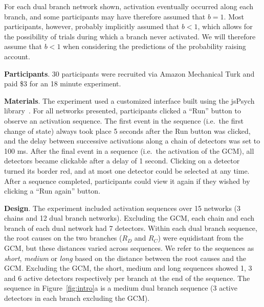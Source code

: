 \documentclass[10pt,letterpaper]{article}
\newcommand{\ev}[2]{$#1_#2$}
\begin{document}
For each dual branch network shown, activation eventually occurred along each branch, and some participants may have therefore assumed that $b=1$. Most participants, however, probably implicitly assumed that $b < 1$, which allows for the possibility of trials during which a branch never activated. We will therefore assume that $b < 1$ when considering the predictions of the probability raising account. 

\textbf{Participants}. 30 participants were recruited via Amazon Mechanical Turk and paid \$3 for an 18 minute experiment.



\textbf{Materials}. The experiment used a customized interface built using the jsPsych library~\cite{jspsych}. For all networks presented, participants clicked a ``Run'' button to observe an activation sequence. The first event in the sequence (i.e.\ the first change of state) always took place 5 seconds after the Run button was clicked, and the delay between successive activations along a chain of detectors was set to 100 ms. After the final event in a sequence (i.e.\ the activation of the GCM), all detectors became clickable after a delay of 1 second. Clicking on a detector turned its border red, and at most one detector could be selected at any time. After a sequence completed, participants could view it again if they wished by clicking a ``Run again'' button.

\textbf{Design}.  The experiment included activation sequences over 15 networks (3 chains and 12 dual branch networks). Excluding the GCM, each chain and each branch of each dual network had 7 detectors.  Within each dual branch sequence, the root causes on the two branches (\ev{R}{D} and \ev{R}{C}) were equidistant from the GCM, but these distances varied across sequences.
We refer to the sequences as \emph{short}, \emph{medium} or \emph{long} based on the distance between the root causes and the GCM. Excluding the GCM, the short, medium and long sequences showed 1, 3 and 6 active detectors respectively per branch at the end of the sequence.  The sequence in Figure~\ref{fig:intro}a is a medium dual branch sequence (3 active detectors in each branch excluding the GCM).
\end{document}
